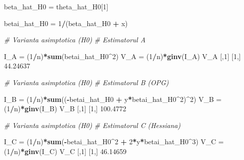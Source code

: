 \documentclass[]{article}
\newenvironment{Shaded}{\begin{snugshade}}{\end{snugshade}}
\newcommand{\KeywordTok}[1]{\textcolor[rgb]{0.13,0.29,0.53}{\textbf{#1}}}
\newcommand{\DecValTok}[1]{\textcolor[rgb]{0.00,0.00,0.81}{#1}}
\newcommand{\FloatTok}[1]{\textcolor[rgb]{0.00,0.00,0.81}{#1}}
\newcommand{\StringTok}[1]{\textcolor[rgb]{0.31,0.60,0.02}{#1}}
\newcommand{\CommentTok}[1]{\textcolor[rgb]{0.56,0.35,0.01}{\textit{#1}}}
\newcommand{\OperatorTok}[1]{\textcolor[rgb]{0.81,0.36,0.00}{\textbf{#1}}}
\newcommand{\NormalTok}[1]{#1}
\begin{document}
\begin{Shaded}
\begin{Highlighting}[]
\NormalTok{beta_hat_H0 =}\StringTok{ }\NormalTok{theta_hat_H0[}\DecValTok{1}\NormalTok{]}

\NormalTok{betai_hat_H0 =}\StringTok{ }\DecValTok{1}\OperatorTok{/}\NormalTok{(beta_hat_H0 }\OperatorTok{+}\StringTok{ }\NormalTok{x)}

\CommentTok{# Varianta asimptotica (H0)}
\CommentTok{# Estimatorul A}

\NormalTok{I_A =}\StringTok{ }\NormalTok{(}\DecValTok{1}\OperatorTok{/}\NormalTok{n)}\OperatorTok{*}\KeywordTok{sum}\NormalTok{(betai_hat_H0}\OperatorTok{^}\DecValTok{2}\NormalTok{)}
\NormalTok{V_A =}\StringTok{ }\NormalTok{(}\DecValTok{1}\OperatorTok{/}\NormalTok{n)}\OperatorTok{*}\KeywordTok{ginv}\NormalTok{(I_A)}
\NormalTok{V_A}
\NormalTok{         [,}\DecValTok{1}\NormalTok{]}
\NormalTok{[}\DecValTok{1}\NormalTok{,] }\FloatTok{44.24637}
\end{Highlighting}
\end{Shaded}

\begin{Shaded}
\begin{Highlighting}[]
\CommentTok{# Varianta asimptotica (H0)}
\CommentTok{# Estimatorul B (OPG)}

\NormalTok{I_B =}\StringTok{ }\NormalTok{(}\DecValTok{1}\OperatorTok{/}\NormalTok{n)}\OperatorTok{*}\KeywordTok{sum}\NormalTok{((}\OperatorTok{-}\NormalTok{betai_hat_H0 }\OperatorTok{+}\StringTok{ }\NormalTok{y}\OperatorTok{*}\NormalTok{betai_hat_H0}\OperatorTok{^}\DecValTok{2}\NormalTok{)}\OperatorTok{^}\DecValTok{2}\NormalTok{)}
\NormalTok{V_B =}\StringTok{ }\NormalTok{(}\DecValTok{1}\OperatorTok{/}\NormalTok{n)}\OperatorTok{*}\KeywordTok{ginv}\NormalTok{(I_B)}
\NormalTok{V_B}
\NormalTok{         [,}\DecValTok{1}\NormalTok{]}
\NormalTok{[}\DecValTok{1}\NormalTok{,] }\FloatTok{100.4772}
\end{Highlighting}
\end{Shaded}

\begin{Shaded}
\begin{Highlighting}[]
\CommentTok{# Varianta asimptotica (H0)}
\CommentTok{# Estimatorul C (Hessiana)}

\NormalTok{I_C =}\StringTok{ }\NormalTok{(}\DecValTok{1}\OperatorTok{/}\NormalTok{n)}\OperatorTok{*}\KeywordTok{sum}\NormalTok{(}\OperatorTok{-}\NormalTok{betai_hat_H0}\OperatorTok{^}\DecValTok{2} \OperatorTok{+}\StringTok{ }\DecValTok{2}\OperatorTok{*}\NormalTok{y}\OperatorTok{*}\NormalTok{betai_hat_H0}\OperatorTok{^}\DecValTok{3}\NormalTok{)}
\NormalTok{V_C =}\StringTok{ }\NormalTok{(}\DecValTok{1}\OperatorTok{/}\NormalTok{n)}\OperatorTok{*}\KeywordTok{ginv}\NormalTok{(I_C)}
\NormalTok{V_C}
\NormalTok{         [,}\DecValTok{1}\NormalTok{]}
\NormalTok{[}\DecValTok{1}\NormalTok{,] }\FloatTok{46.14659}
\end{Highlighting}
\end{Shaded}
\end{document}
